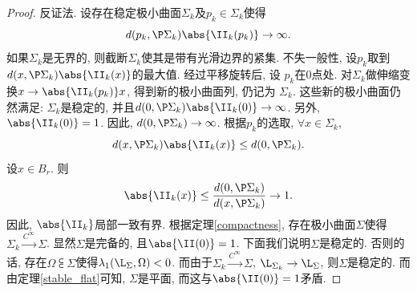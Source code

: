 \begin{proof}
    反证法. 设存在稳定极小曲面$\Sigma_k$及$p_k \in \Sigma_k$使得
    \begin{equation}
        d(p_k, \P \Sigma_k)\abs{\II_k(p_k)}  \to \infty.
    \end{equation}
    如果$\Sigma_k$是无界的, 则截断$\Sigma_k$使其是带有光滑边界的紧集. 不失一般性, 设$p_k$取到$d(x,\P \Sigma_k)\abs{\II_k(x)}$的最大值. 经过平移旋转后, 设 $p_k$在0点处. 对$\Sigma_k$做伸缩变换$ x \to \abs{\II_k(p_k)}x$, 得到新的极小曲面列, 仍记为 $\Sigma_k$. 这些新的极小曲面仍然满足: $\Sigma_k$是稳定的, 并且$d(0, \P \Sigma_k)\abs{\II_k(0)} \to \infty$. 另外,  $\abs{\II_k(0)}=1$. 因此, $d(0, \P \Sigma_k) \to \infty$. 根据$p_k$的选取, $\forall x \in \Sigma_k$,
    \begin{equation}
        d(x,\P \Sigma_k)\abs{\II_k(x)} \le d(0,\P \Sigma_k).
    \end{equation}
    设$x \in B_r$. 则
    \begin{equation}
        \abs{\II_k(x)} \le \frac{d(0,\P \Sigma_k)}{d(x,\P \Sigma_k)} \to 1.
    \end{equation}
    因此, $\abs{\II_k}$局部一致有界. 根据定理\eqref{compactness}, 存在极小曲面$\Sigma$使得$\Sigma_k \overset{C^\infty}{\longrightarrow} \Sigma$. 显然$\Sigma$是完备的, 且$\abs{\II(0)}=1$. 下面我们说明$\Sigma$是稳定的.  否则的话, 存在$\Omega \subsub \Sigma$使得$\lambda_1(\L_\Sigma,\Omega) < 0$. 而由于$\Sigma_k \overset{C^\infty}{\longrightarrow} \Sigma$, $\L_{\Sigma_k} \to \L_\Sigma$, 则$\Sigma$是稳定的. 而由定理\eqref{stable_flat}可知, $\Sigma$是平面, 而这与$\abs{\II(0)}=1$矛盾.
\end{proof}
